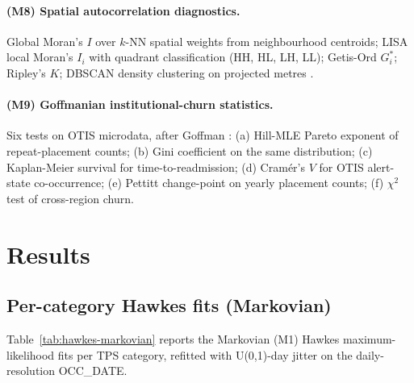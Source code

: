 \documentclass[11pt,a4paper]{article}
\newcommand{\1}{\mathbf{1}}
\theoremstyle{plain}
\theoremstyle{definition}
\begin{document}
\paragraph{(M8) Spatial autocorrelation diagnostics.}
Global Moran's $I$ over $k$-NN spatial weights from neighbourhood
centroids; LISA local Moran's $I_i$ with quadrant classification
(HH, HL, LH, LL); Getis-Ord $G^\ast_i$; Ripley's $K$; DBSCAN
density clustering on projected metres \cite{ester1996dbscan}.

\paragraph{(M9) Goffmanian institutional-churn statistics.}  Six
tests on OTIS microdata, after Goffman \cite{goffman1961asylums}:
(a) Hill-MLE Pareto exponent of repeat-placement counts; (b) Gini
coefficient on the same distribution; (c) Kaplan-Meier survival
for time-to-readmission; (d) Cramér's $V$ for OTIS alert-state
co-occurrence; (e) Pettitt change-point on yearly placement counts;
(f) $\chi^2$ test of cross-region churn.

\section{Results}\label{sec:results}

\subsection{Per-category Hawkes fits (Markovian)}\label{sec:hawkes}

Table~\ref{tab:hawkes-markovian} reports the Markovian (M1) Hawkes
maximum-likelihood fits per TPS category, refitted with U(0,1)-day
jitter on the daily-resolution OCC\_DATE.
\end{document}
